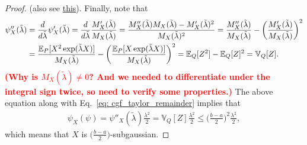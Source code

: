 \documentclass[twoside]{article}
\begin{document}
\begin{proof}
      (also see \href{https://en.wikipedia.org/wiki/Popoviciu%27s_inequality_on_variances}{this}). Finally, note that
      \begin{align*}
        \psi''_X(\tilde \lambda) &= \frac{d}{d \tilde \lambda} \psi'_X(\tilde \lambda) = \frac{d}{d \tilde \lambda} \frac{M'_X(\tilde \lambda)}{M_X(\tilde \lambda)} = \frac{M''_X(\tilde \lambda) M_X(\tilde \lambda) - M'_X(\tilde \lambda)^2}{M_X(\tilde \lambda)^2} = \frac{M''_X(\tilde \lambda)}{M_X(\tilde \lambda)} - \bigg( \frac{M'_X(\tilde \lambda)}{M_X(\tilde \lambda)} \bigg)^2 \\
        &= \frac{\mathbb{E}_P[X^2 \exp(\tilde \lambda X)]}{M_X(\tilde \lambda)} - \bigg(\frac{\mathbb{E}_P[X \exp(\tilde \lambda X)]}{M_X(\tilde \lambda)} \bigg)^2 = \mathbb{E}_Q[Z^2] - \mathbb{E}_Q[Z]^2 = \mathbb{V}_Q[Z].
      \end{align*}
      \textbf{\textcolor{red}{(Why is $M_X(\tilde \lambda) \neq 0$? And we needed to differentiate under the integral sign twice, so need to verify some properties.)}}
      The above equation along with Eq.\ \ref{eq: cgf_taylor_remainder} implies that
      \begin{align*}
        \psi_X(\psi) = \psi''_X(\tilde \lambda) \frac{\lambda^2}{2} = \mathbb{V}_Q[Z] \frac{\lambda^2}{2} \leq \bigg(\frac{b-a}{2}\bigg)^2 \frac{\lambda^2}{2},
      \end{align*}
      which means that $X$ is $\big( \frac{b-a}{2} \big)$-subgaussian.
    \end{proof}
      


\end{document}
